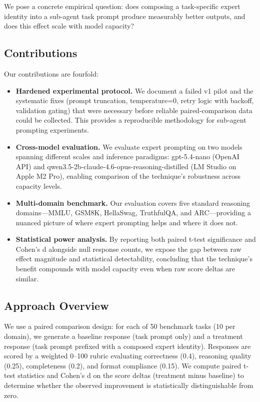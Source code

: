 \documentclass[anonymous, submission, paper]{iclr2026}
\begin{document}
We pose a concrete empirical question: does composing a task-specific expert identity into a sub-agent task prompt produce measurably better outputs, and does this effect scale with model capacity?

\subsection{Contributions}
\label{sec:contributions}

Our contributions are fourfold:

\begin{itemize}
  \item \textbf{Hardened experimental protocol.} We document a failed v1 pilot and the systematic fixes (prompt truncation, temperature=0, retry logic with backoff, validation gating) that were necessary before reliable paired-comparison data could be collected. This provides a reproducible methodology for sub-agent prompting experiments.

  \item \textbf{Cross-model evaluation.} We evaluate expert prompting on two models spanning different scales and inference paradigms: gpt-5.4-nano (OpenAI API) and qwen3.5-2b-claude-4.6-opus-reasoning-distilled (LM Studio on Apple M2 Pro), enabling comparison of the technique's robustness across capacity levels.

  \item \textbf{Multi-domain benchmark.} Our evaluation covers five standard reasoning domains---MMLU, GSM8K, HellaSwag, TruthfulQA, and ARC---providing a nuanced picture of where expert prompting helps and where it does not.

  \item \textbf{Statistical power analysis.} By reporting both paired t-test significance and Cohen's d alongside null response counts, we expose the gap between raw effect magnitude and statistical detectability, concluding that the technique's benefit compounds with model capacity even when raw score deltas are similar.
\end{itemize}

\subsection{Approach Overview}
\label{sec:approach}

We use a paired comparison design: for each of 50 benchmark tasks (10 per domain), we generate a baseline response (task prompt only) and a treatment response (task prompt prefixed with a composed expert identity). Responses are scored by a weighted 0--100 rubric evaluating correctness (0.4), reasoning quality (0.25), completeness (0.2), and format compliance (0.15). We compute paired t-test statistics and Cohen's d on the score deltas (treatment minus baseline) to determine whether the observed improvement is statistically distinguishable from zero.
\end{document}

